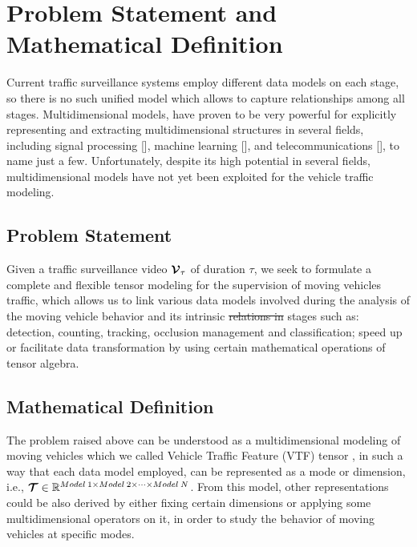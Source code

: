 \documentclass[sensors,article,submit,moreauthors,pdftex]{Definitions/mdpi}
\newcommand{\mathten}[1]{\boldsymbol{\mathbf{\mathcal{\MakeUppercase{#1}}}}}
\providecommand{\DIFadd}[1]{{\protect\color{blue}\uwave{#1}}} %
\providecommand{\DIFdel}[1]{{\protect\color{red}\sout{#1}}}                      %
\providecommand{\DIFaddbegin}{} %
\providecommand{\DIFaddend}{} %
\providecommand{\DIFdelbegin}{} %
\providecommand{\DIFdelend}{} %
\begin{document}
\section{Problem Statement and Mathematical Definition}

Current traffic surveillance systems employ different data models on each stage, so there is no such unified model which allows to capture relationships among all stages. Multidimensional models, have proven to be very powerful for explicitly representing and extracting multidimensional structures in several fields, including signal processing [], machine learning [],  and telecommunications [], to name just a few. Unfortunately, despite its high potential in several fields, multidimensional models have not yet been exploited for the vehicle traffic modeling.



\subsection{Problem Statement}
Given a traffic surveillance video $\mathten{V}_\tau$ of duration $\tau$, we seek to formulate a complete and flexible tensor modeling for the supervision of moving vehicles traffic, which allows us to link various data models involved during the analysis of the moving vehicle behavior and its intrinsic \DIFdelbegin \DIFdel{relations in }\DIFdelend \DIFaddbegin \DIFadd{interactions among multiple }\DIFaddend stages such as: detection, counting, tracking, occlusion management and classification; speed up or facilitate data transformation by using certain mathematical operations of tensor algebra.



\subsection{Mathematical Definition}
The problem raised above can be understood as a multidimensional modeling of moving vehicles which we called Vehicle Traffic Feature (VTF) tensor \DIFaddbegin \DIFadd{model}\DIFaddend , in such a way that each data model employed, can be represented as a mode or dimension, i.e., $\mathten{T} \in \mathbb{R}^{Model\:1 \times Model\:2 \times \cdots \times Model\:N}$. From this model, other representations could be also derived by either fixing certain dimensions or applying some multidimensional operators on it, in order to study the behavior of moving vehicles at specific modes.
\end{document}
